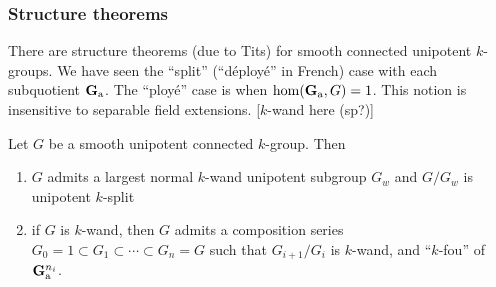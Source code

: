 \subsubsection{Structure theorems}

There are structure theorems (due to Tits) for smooth connected unipotent 
$k$-groups. We have seen the ``split'' (``d\'eploy\'e'' in French) case with 
each subquotient $\mathbf{G}_{\mathrm{a}}$. The ``ploy\'e'' case is when 
$\hom(\mathbf{G}_{\mathrm{a}},G)=1$. This notion is insensitive to separable field 
extensions. [$k$-wand here (sp?)]

\begin{theo}[Tits]
Let $G$ be a smooth unipotent connected $k$-group. Then 
\begin{enumerate}
  \item $G$ admits a largest normal $k$-wand unipotent subgroup $G_w$ 
    and $G/G_w$ is unipotent $k$-split
  \item if $G$ is $k$-wand, then $G$ admits a composition series 
    $G_0=1\subset G_1\subset \cdots \subset G_n=G$ such that 
      $G_{i+1}/G_i$ is $k$-wand, and ``$k$-fou'' of $\mathbf{G}_{\mathrm{a}}^{n_i}$. 
\end{enumerate}
\end{theo}





%
%

%
